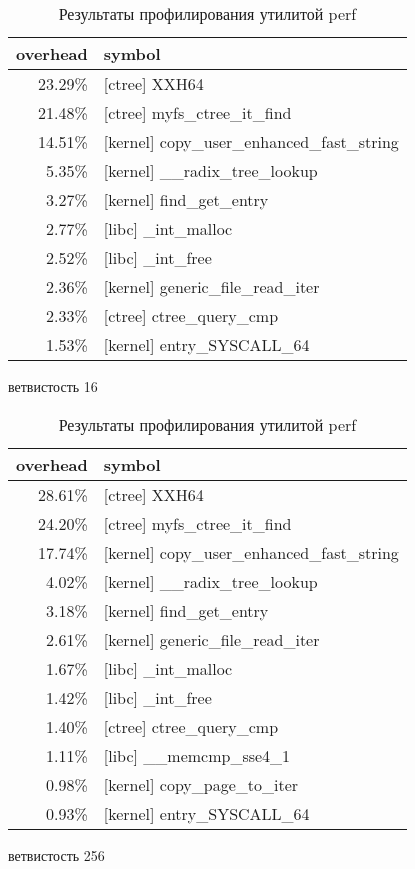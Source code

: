 \begin{table}[h]
  \centering
  \begin{subfigure}{.5\textwidth}
    \begin{tabular}{ r l }
        overhead & symbol \\ \hline
        23.29\% & [ctree] XXH64 \\
        21.48\% & [ctree] myfs\_ctree\_it\_find \\
        14.51\% & [kernel] copy\_user\_enhanced\_fast\_string \\
        5.35\%  & [kernel] \_\_radix\_tree\_lookup \\
        3.27\%  & [kernel] find\_get\_entry \\
        2.77\%  & [libc] \_int\_malloc \\
        2.52\%  & [libc] \_int\_free \\
        2.36\%  & [kernel] generic\_file\_read\_iter \\
        2.33\%  & [ctree] ctree\_query\_cmp \\
        1.53\%  & [kernel] entry\_SYSCALL\_64 \\
    \end{tabular}
    \caption{ветвистость 16}
  \end{subfigure}
  \begin{subfigure}{.5\textwidth}
    \begin{tabular}{ r l }
        overhead & symbol \\ \hline
        28.61\% & [ctree] XXH64 \\
        24.20\% & [ctree] myfs\_ctree\_it\_find \\
        17.74\% & [kernel] copy\_user\_enhanced\_fast\_string \\
        4.02\%  & [kernel] \_\_radix\_tree\_lookup \\
        3.18\%  & [kernel] find\_get\_entry \\
        2.61\%  & [kernel] generic\_file\_read\_iter \\
        1.67\%  & [libc] \_int\_malloc \\
        1.42\%  & [libc] \_int\_free \\
        1.40\%  & [ctree] ctree\_query\_cmp \\
        1.11\%  & [libc] \_\_memcmp\_sse4\_1 \\
        0.98\%  & [kernel] copy\_page\_to\_iter \\
        0.93\%  & [kernel] entry\_SYSCALL\_64 \\
    \end{tabular}
    \caption{ветвистость 256}
  \end{subfigure}
  \caption{Результаты профилирования утилитой perf}
  \label{tbl:prof}
\end{table}

